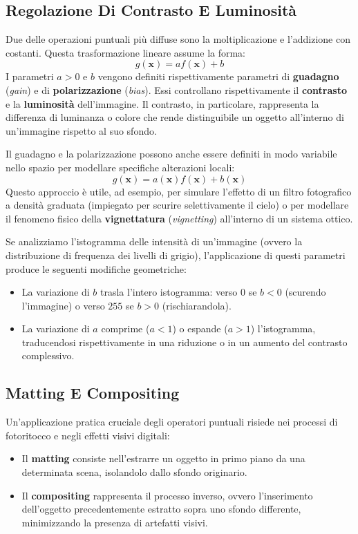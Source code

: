 ﻿\documentclass[11pt, a4paper]{article}
\begin{document}
\subsection{Regolazione Di Contrasto E Luminosità}

Due delle operazioni puntuali più diffuse sono la moltiplicazione e l'addizione con costanti. Questa trasformazione lineare assume la forma:
\[ \boxed{g(\bm{x}) = a f(\bm{x}) + b} \]
I parametri $a > 0$ e $b$ vengono definiti rispettivamente parametri di \textbf{guadagno} (\emph{gain}) e di \textbf{polarizzazione} (\emph{bias}). Essi controllano rispettivamente il \textbf{contrasto} e la \textbf{luminosità} dell'immagine. Il contrasto, in particolare, rappresenta la differenza di luminanza o colore che rende distinguibile un oggetto all'interno di un'immagine rispetto al suo sfondo.

Il guadagno e la polarizzazione possono anche essere definiti in modo variabile nello spazio per modellare specifiche alterazioni locali:
\[ g(\bm{x}) = a(\bm{x}) f(\bm{x}) + b(\bm{x}) \]
Questo approccio è utile, ad esempio, per simulare l'effetto di un filtro fotografico a densità graduata (impiegato per scurire selettivamente il cielo) o per modellare il fenomeno fisico della \textbf{vignettatura} (\emph{vignetting}) all'interno di un sistema ottico.

Se analizziamo l'istogramma delle intensità di un'immagine (ovvero la distribuzione di frequenza dei livelli di grigio), l'applicazione di questi parametri produce le seguenti modifiche geometriche:
\begin{itemize}
    \item La variazione di $b$ trasla l'intero istogramma: verso $0$ se $b < 0$ (scurendo l'immagine) o verso $255$ se $b > 0$ (rischiarandola).
    \item La variazione di $a$ comprime ($a < 1$) o espande ($a > 1$) l'istogramma, traducendosi rispettivamente in una riduzione o in un aumento del contrasto complessivo.
\end{itemize}


\subsection{Matting E Compositing}

Un'applicazione pratica cruciale degli operatori puntuali risiede nei processi di fotoritocco e negli effetti visivi digitali:
\begin{itemize}
    \item Il \textbf{matting} consiste nell'estrarre un oggetto in primo piano da una determinata scena, isolandolo dallo sfondo originario.
    \item Il \textbf{compositing} rappresenta il processo inverso, ovvero l'inserimento dell'oggetto precedentemente estratto sopra uno sfondo differente, minimizzando la presenza di artefatti visivi.
\end{itemize}
\end{document}
